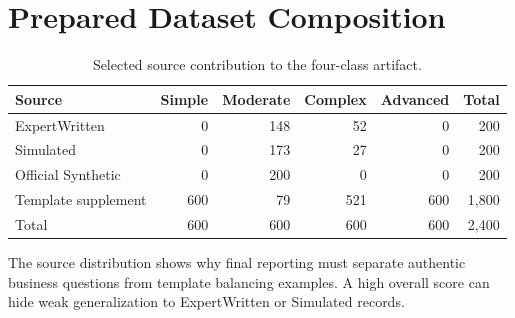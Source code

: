 \section{Prepared Dataset Composition}

\begin{table}[H]
  \centering
  \caption{Selected source contribution to the four-class artifact.}
  \begin{tabular}{lrrrrr}
    \toprule
    Source & Simple & Moderate & Complex & Advanced & Total\\
    \midrule
    ExpertWritten & 0 & 148 & 52 & 0 & 200\\
    Simulated & 0 & 173 & 27 & 0 & 200\\
    Official Synthetic & 0 & 200 & 0 & 0 & 200\\
    Template supplement & 600 & 79 & 521 & 600 & 1,800\\
    \midrule
    Total & 600 & 600 & 600 & 600 & 2,400\\
    \bottomrule
  \end{tabular}
\end{table}

The source distribution shows why final reporting must separate authentic
business questions from template balancing examples. A high overall score can
hide weak generalization to ExpertWritten or Simulated records.
